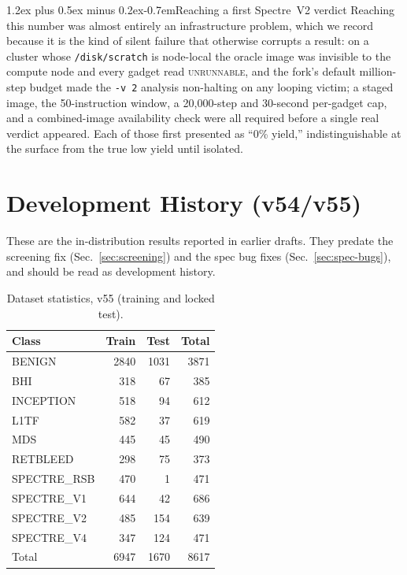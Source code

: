 \documentclass[conference]{IEEEtran}
\makeatletter
\renewcommand\paragraph{\@startsection{paragraph}{4}{\z@}%
  {1.2ex plus 0.5ex minus 0.2ex}{-0.7em}{\normalfont\normalsize\bfseries}}
\makeatother
\begin{document}
\paragraph{Reaching a first Spectre~V2 verdict}
Reaching this
number was almost entirely an infrastructure problem, which we record because
it is the kind of silent failure that otherwise corrupts a result: on a cluster
whose \texttt{/disk/scratch} is node-local the oracle image was invisible to the
compute node and every gadget read \textsc{unrunnable}, and the fork's default
million-step budget made the \texttt{-v 2} analysis non-halting on any looping
victim; a staged image, the 50-instruction window, a 20{,}000-step and
30-second per-gadget cap, and a combined-image availability check were all
required before a single real verdict appeared. Each of those first presented
as ``0\% yield,'' indistinguishable at the surface from the true low yield
until isolated.

\section{Development History (v54/v55)}
\label{app:history}

These are the in-distribution results reported in earlier drafts. They
predate the screening fix (Sec.~\ref{sec:screening}) and the spec bug fixes
(Sec.~\ref{sec:spec-bugs}), and should be read as development history.

\begin{table}[h]
\centering
\caption{Dataset statistics, v55 (training and locked test).}
\label{tab:data}
\footnotesize
\begin{tabular}{@{}lrrr@{}}
\toprule
Class & Train & Test & Total \\
\midrule
BENIGN       & 2840 & 1031 & 3871 \\
BHI          &  318 &   67 &  385 \\
INCEPTION    &  518 &   94 &  612 \\
L1TF         &  582 &   37 &  619 \\
MDS          &  445 &   45 &  490 \\
RETBLEED     &  298 &   75 &  373 \\
SPECTRE\_RSB &  470 &    1 &  471 \\
SPECTRE\_V1  &  644 &   42 &  686 \\
SPECTRE\_V2  &  485 &  154 &  639 \\
SPECTRE\_V4  &  347 &  124 &  471 \\
\midrule
Total        & 6947 & 1670 & 8617 \\
\bottomrule
\end{tabular}
\end{table}
\end{document}
